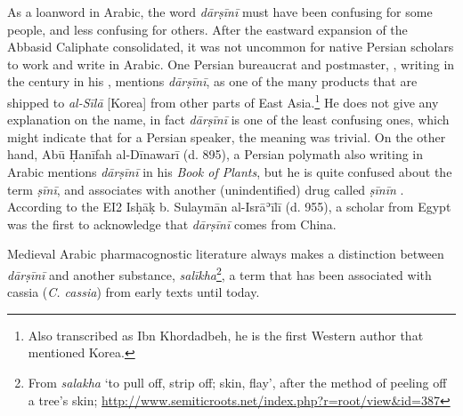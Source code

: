 As a loanword in Arabic, the word \textit{dārṣīnī} must have been confusing for some people, and less confusing for others. After the eastward expansion of the Abbasid Caliphate consolidated, it was not uncommon for native Persian scholars to work and write in Arabic. One Persian bureaucrat and postmaster, \textcite[71]{ibn_khurdadhbih_kitab_870}, writing in the  century in his , mentions \textit{dārṣīnī}, as one of the many products that are shipped to \textit{al-Sīlā} [Korea] from other parts of East Asia.\footnote{Also transcribed as Ibn Khordadbeh, he is the first Western author that mentioned Korea.} He does not give any explanation on the name, in fact \textit{dārṣīnī} is one of the least confusing ones, which might indicate that for a Persian speaker, the meaning was trivial. On the other hand, Abū Ḥanīfah al-Dīnawarī (d. 895), a Persian polymath also writing in Arabic mentions \textit{dārṣīnī} in his \textit{Book of Plants}, but he is quite confused about the term \textit{ṣīnī}, and associates with another (unindentified) drug called \textit{ṣīnīn} \autocite[210]{ad-dinawari_book_1974}. According to the \gls{EI2} Isḥāḳ b. Sulaymān al-Isrāʾīlī (d. 955), a scholar from Egypt was the first to acknowledge that \textit{dārṣīnī} comes from China.



Medieval Arabic pharmacognostic literature always makes a distinction between \textit{dārṣīnī} and another substance, 
\textit{salīkha}\footnote{From \textit{salakha} `to pull off, strip off; skin, flay', after the method of peeling off a tree's skin; \url{http://www.semiticroots.net/index.php?r=root/view&id=387}}, a term that has been associated with cassia (\textit{C. cassia}) from early texts until today. 

